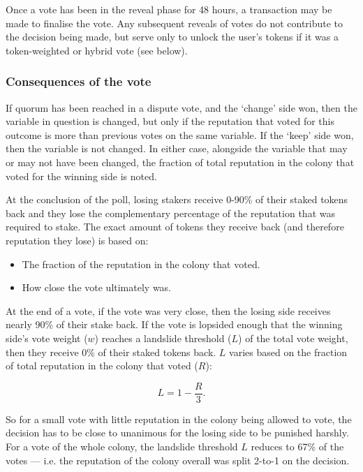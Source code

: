Once a vote has been in the reveal phase for 48 hours, a transaction may be made to finalise the vote. Any subsequent reveals of votes do not contribute to the decision being made, but serve only to unlock the user's tokens if it was a token-weighted or hybrid vote (see below).

\subsubsection*{Consequences of the vote}

If quorum has been reached in a dispute vote, and the `change' side won, then the variable in question is changed, but only if the reputation that voted for this outcome is more than previous votes on the same variable. If the `keep' side won, then the variable is not changed. In either case, alongside the variable that may or may not have been changed, the fraction of total reputation in the colony that voted for the winning side is noted.

At the conclusion of the poll, losing stakers receive 0-90\% of their staked tokens back and they lose the  complementary percentage of the reputation that was required to stake. The exact amount of tokens they receive back (and therefore reputation they lose) is based on:

\begin{itemize}
 \item The fraction of the reputation in the colony that voted.
 \item How close the vote ultimately was.
\end{itemize}

At the end of a vote, if the vote was very close, then the losing side receives nearly 90\% of their stake back. If the vote is lopsided enough that the winning side's vote weight ($w$) reaches a landslide threshold ($L$) of the total vote weight, then they receive 0\% of their staked tokens back. $L$ varies based on the fraction of total reputation in the colony that voted ($R$):

\begin{equation}
L = 1 - \frac{R}{3}.
\end{equation}

So for a small vote with little reputation in the colony being allowed to vote, the decision has to be close to unanimous for the losing side to be punished harshly. For a vote of the whole colony, the landslide threshold $L$ reduces to 67\% of the votes --- i.e. the reputation of the colony overall was split 2-to-1 on the decision.

